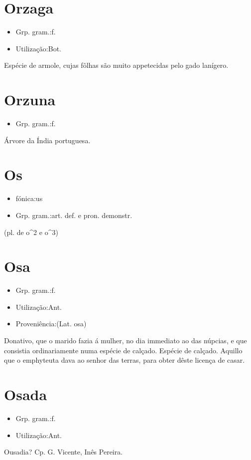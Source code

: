 \section{Orzaga}
\begin{itemize}
\item {Grp. gram.:f.}
\end{itemize}
\begin{itemize}
\item {Utilização:Bot.}
\end{itemize}
Espécie de armole, cujas fôlhas são muito appetecidas pelo gado lanígero.
\section{Orzuna}
\begin{itemize}
\item {Grp. gram.:f.}
\end{itemize}
Árvore da Índia portuguesa.
\section{Os}
\begin{itemize}
\item {fónica:us}
\end{itemize}
\begin{itemize}
\item {Grp. gram.:art. def.  e  pron. demonstr.}
\end{itemize}
(pl. de \textunderscore o\textunderscore ^2 e \textunderscore o\textunderscore ^3)
\section{Osa}
\begin{itemize}
\item {Grp. gram.:f.}
\end{itemize}
\begin{itemize}
\item {Utilização:Ant.}
\end{itemize}
\begin{itemize}
\item {Proveniência:(Lat. \textunderscore osa\textunderscore )}
\end{itemize}
Donativo, que o marido fazia á mulher, no dia immediato ao das núpcias, e que consistia ordinariamente numa espécie de calçado.
Espécie de calçado.
Aquillo que o emphyteuta dava ao senhor das terras, para obter dêste licença de casar.
\section{Osada}
\begin{itemize}
\item {Grp. gram.:f.}
\end{itemize}
\begin{itemize}
\item {Utilização:Ant.}
\end{itemize}
Ousadia? Cp. G. Vicente, \textunderscore Inês Pereira\textunderscore .
